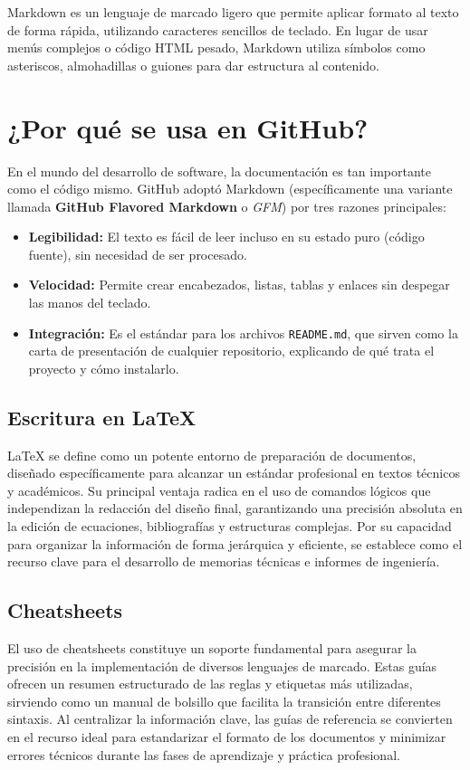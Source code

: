 \documentclass[runningheads]{llncs}
\begin{document}
Markdown es un lenguaje de marcado ligero que permite aplicar formato al texto de forma rápida, utilizando caracteres sencillos de teclado. En lugar de usar menús complejos o código HTML pesado, Markdown utiliza símbolos como asteriscos, almohadillas o guiones para dar estructura al contenido.

\section*{¿Por qué se usa en GitHub?}

En el mundo del desarrollo de software, la documentación es tan importante como el código mismo. GitHub adoptó Markdown (específicamente una variante llamada \textbf{GitHub Flavored Markdown} o \textit{GFM}) por tres razones principales:

\begin{itemize}
    \item \textbf{Legibilidad:} El texto es fácil de leer incluso en su estado puro (código fuente), sin necesidad de ser procesado.
    \item \textbf{Velocidad:} Permite crear encabezados, listas, tablas y enlaces sin despegar las manos del teclado.
    \item \textbf{Integración:} Es el estándar para los archivos \texttt{README.md}, que sirven como la carta de presentación de cualquier repositorio, explicando de qué trata el proyecto y cómo instalarlo.
\end{itemize}

\subsection{Escritura en LaTeX}

LaTeX se define como un potente entorno de preparación de documentos, diseñado específicamente para alcanzar un estándar profesional en textos técnicos y académicos. Su principal ventaja radica en el uso de comandos lógicos que independizan la redacción del diseño final, garantizando una precisión absoluta en la edición de ecuaciones, bibliografías y estructuras complejas. Por su capacidad para organizar la información de forma jerárquica y eficiente, se establece como el recurso clave para el desarrollo de memorias técnicas e informes de ingeniería.

\subsection{Cheatsheets}
El uso de cheatsheets constituye un soporte fundamental para asegurar la precisión en la implementación de diversos lenguajes de marcado. Estas guías ofrecen un resumen estructurado de las reglas y etiquetas más utilizadas, sirviendo como un manual de bolsillo que facilita la transición entre diferentes sintaxis. Al centralizar la información clave, las guías de referencia se convierten en el recurso ideal para estandarizar el formato de los documentos y minimizar errores técnicos durante las fases de aprendizaje y práctica profesional.
\end{document}
